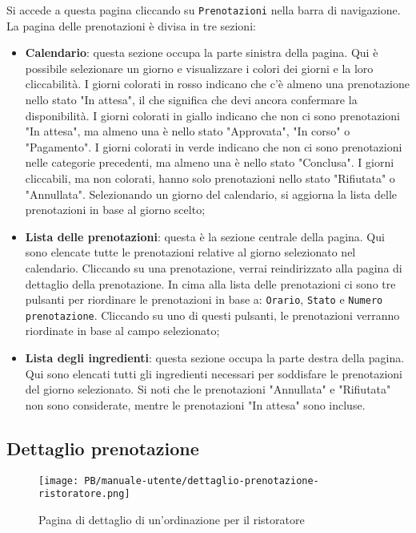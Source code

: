 Si accede a questa pagina cliccando su \texttt{Prenotazioni} nella barra di
navigazione. La pagina delle prenotazioni è divisa in tre sezioni:
\begin{itemize}
	\item \textbf{Calendario}: questa sezione occupa la parte sinistra della pagina. Qui è possibile selezionare un giorno e visualizzare i colori dei giorni e la loro cliccabilità. I giorni colorati in rosso indicano che c'è almeno una prenotazione nello stato "In attesa", il che significa che devi ancora confermare la disponibilità. I giorni colorati in giallo indicano che non ci sono prenotazioni "In attesa", ma almeno una è nello stato "Approvata", "In corso" o "Pagamento". I giorni colorati in verde indicano che non ci sono prenotazioni nelle categorie precedenti, ma almeno una è nello stato "Conclusa". I giorni cliccabili, ma non colorati, hanno solo prenotazioni nello stato "Rifiutata" o "Annullata". Selezionando un giorno del calendario, si aggiorna la lista delle prenotazioni in base al giorno scelto;
	\item \textbf{Lista delle prenotazioni}: 
	questa è la sezione centrale della pagina. Qui sono elencate tutte le prenotazioni relative al giorno selezionato nel calendario. Cliccando su una prenotazione, verrai reindirizzato alla pagina di dettaglio della prenotazione. In cima alla lista delle prenotazioni ci sono tre pulsanti per riordinare le prenotazioni in base a: \texttt{Orario}, \texttt{Stato} e \texttt{Numero prenotazione}. Cliccando su uno di questi pulsanti, le prenotazioni verranno riordinate in base al campo selezionato;
	\item \textbf{Lista degli ingredienti}: 
	questa sezione occupa la parte destra della pagina. Qui sono elencati tutti gli ingredienti necessari per soddisfare le prenotazioni del giorno selezionato. Si noti che le prenotazioni "Annullata" e "Rifiutata" non sono considerate, mentre le prenotazioni "In attesa" sono incluse.
\end{itemize}

\subsection{Dettaglio prenotazione}

\begin{figure}[htbp]
    \centering
	\texttt{[image: PB/manuale-utente/dettaglio-prenotazione-ristoratore.png]}
    \caption{Pagina di dettaglio di un'ordinazione per il ristoratore}
\end{figure}

